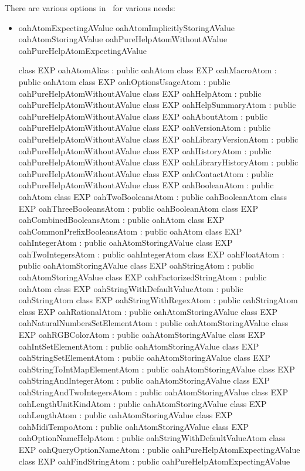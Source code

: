 There are various options in \mr\ for various needs:
\begin{itemize}
\item oahAtomExpectingAValue
oahAtomImplicitlyStoringAValue
oahAtomStoringAValue
oahPureHelpAtomWithoutAValue
oahPureHelpAtomExpectingAValue

class EXP oahAtomAlias : public oahAtom
class EXP oahMacroAtom : public oahAtom
class EXP oahOptionsUsageAtom : public oahPureHelpAtomWithoutAValue
class EXP oahHelpAtom : public oahPureHelpAtomWithoutAValue
class EXP oahHelpSummaryAtom : public oahPureHelpAtomWithoutAValue
class EXP oahAboutAtom : public oahPureHelpAtomWithoutAValue
class EXP oahVersionAtom : public oahPureHelpAtomWithoutAValue
class EXP oahLibraryVersionAtom : public oahPureHelpAtomWithoutAValue
class EXP oahHistoryAtom : public oahPureHelpAtomWithoutAValue
class EXP oahLibraryHistoryAtom : public oahPureHelpAtomWithoutAValue
class EXP oahContactAtom : public oahPureHelpAtomWithoutAValue
class EXP oahBooleanAtom : public oahAtom
class EXP oahTwoBooleansAtom : public oahBooleanAtom
class EXP oahThreeBooleansAtom : public oahBooleanAtom
class EXP oahCombinedBooleansAtom : public oahAtom
class EXP oahCommonPrefixBooleansAtom : public oahAtom
class EXP oahIntegerAtom : public oahAtomStoringAValue
class EXP oahTwoIntegersAtom : public oahIntegerAtom
class EXP oahFloatAtom : public oahAtomStoringAValue
class EXP oahStringAtom : public oahAtomStoringAValue
class EXP oahFactorizedStringAtom : public oahAtom
class EXP oahStringWithDefaultValueAtom : public oahStringAtom
class EXP oahStringWithRegexAtom : public oahStringAtom
class EXP oahRationalAtom : public oahAtomStoringAValue
class EXP oahNaturalNumbersSetElementAtom : public oahAtomStoringAValue
class EXP oahRGBColorAtom : public oahAtomStoringAValue
class EXP oahIntSetElementAtom : public oahAtomStoringAValue
class EXP oahStringSetElementAtom : public oahAtomStoringAValue
class EXP oahStringToIntMapElementAtom : public oahAtomStoringAValue
class EXP oahStringAndIntegerAtom : public oahAtomStoringAValue
class EXP oahStringAndTwoIntegersAtom : public oahAtomStoringAValue
class EXP oahLengthUnitKindAtom : public oahAtomStoringAValue
class EXP oahLengthAtom : public oahAtomStoringAValue
class EXP oahMidiTempoAtom : public oahAtomStoringAValue
class EXP oahOptionNameHelpAtom : public oahStringWithDefaultValueAtom
class EXP oahQueryOptionNameAtom : public oahPureHelpAtomExpectingAValue
class EXP oahFindStringAtom : public oahPureHelpAtomExpectingAValue


\end{itemize}


